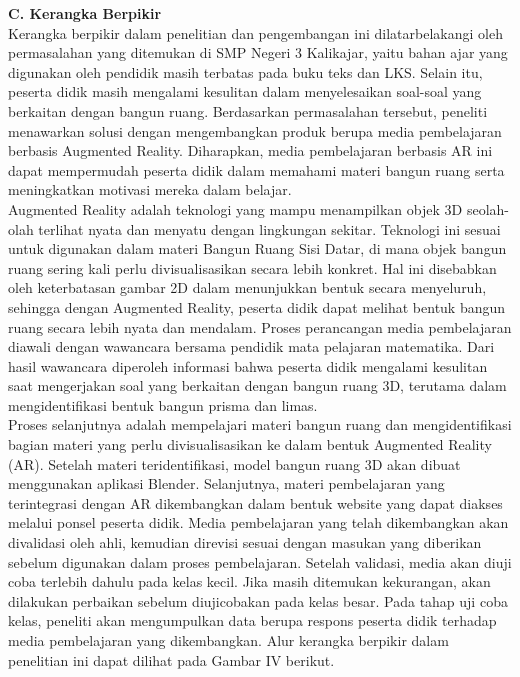 \documentclass[12pt]{article}
\begin{document}
\textbf{C. Kerangka Berpikir}\\
\hspace*{1cm}Kerangka berpikir dalam penelitian dan pengembangan ini dilatarbelakangi oleh permasalahan yang ditemukan di SMP Negeri 3 Kalikajar, yaitu bahan ajar yang digunakan oleh pendidik masih terbatas pada buku teks dan LKS. Selain itu, peserta didik masih mengalami kesulitan dalam menyelesaikan soal-soal yang berkaitan dengan bangun ruang. Berdasarkan permasalahan tersebut, peneliti menawarkan solusi dengan mengembangkan produk berupa media pembelajaran berbasis Augmented Reality. Diharapkan, media pembelajaran berbasis AR ini dapat mempermudah peserta didik dalam memahami materi bangun ruang serta meningkatkan motivasi mereka dalam belajar.\\
\hspace*{1cm}Augmented Reality adalah teknologi yang mampu menampilkan objek 3D seolah-olah terlihat nyata dan menyatu dengan lingkungan sekitar. Teknologi ini sesuai untuk digunakan dalam materi Bangun Ruang Sisi Datar, di mana objek bangun ruang sering kali perlu divisualisasikan secara lebih konkret. Hal ini disebabkan oleh keterbatasan gambar 2D dalam menunjukkan bentuk secara menyeluruh, sehingga dengan Augmented Reality, peserta didik dapat melihat bentuk bangun ruang secara lebih nyata dan mendalam. Proses perancangan media pembelajaran diawali dengan wawancara bersama pendidik mata pelajaran matematika. Dari hasil wawancara diperoleh informasi bahwa peserta didik mengalami kesulitan saat mengerjakan soal yang berkaitan dengan bangun ruang 3D, terutama dalam mengidentifikasi bentuk bangun prisma dan limas.\\
\hspace*{1cm}Proses selanjutnya adalah mempelajari materi bangun ruang dan mengidentifikasi bagian materi yang perlu divisualisasikan ke dalam bentuk Augmented Reality (AR). Setelah materi teridentifikasi, model bangun ruang 3D akan dibuat menggunakan aplikasi Blender. Selanjutnya, materi pembelajaran yang terintegrasi dengan AR dikembangkan dalam bentuk website yang dapat diakses melalui ponsel peserta didik. Media pembelajaran yang telah dikembangkan akan divalidasi oleh ahli, kemudian direvisi sesuai dengan masukan yang diberikan sebelum digunakan dalam proses pembelajaran. Setelah validasi, media akan diuji coba terlebih dahulu pada kelas kecil. Jika masih ditemukan kekurangan, akan dilakukan perbaikan sebelum diujicobakan pada kelas besar. Pada tahap uji coba kelas, peneliti akan mengumpulkan data berupa respons peserta didik terhadap media pembelajaran yang dikembangkan. Alur kerangka berpikir dalam penelitian ini dapat dilihat pada Gambar IV berikut.
\end{document}
